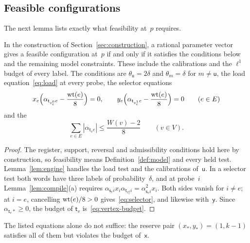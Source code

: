\subsection{Feasible configurations}\label{sec:feasible}

The next lemma lists exactly what feasibility at~$p$ requires.

\begin{lemma}\label{lem:feasible}
In the construction of Section~\ref{sec:construction}, a rational parameter
vector gives a feasible configuration at~$p$ if and only if it satisfies
the conditions below and the remaining model constraints. These include
the calibrations and the $\ell^1$ budget of every label. The conditions
are $\theta_{\mathsf u}=2\delta$ and $\theta_m=\delta$ for $m\neq\mathsf
u$, the load equation~\eqref{eq:load} at every probe, the selector
equations
\begin{equation}\label{eq:selector}
  x_e\Bigl(\alpha_{\mathsf t_{v_e^0}e}-\frac{\operatorname{wt}(e)}8\Bigr)=0,\qquad
  y_e\Bigl(\alpha_{\mathsf t_{v_e^1}e}-\frac{\operatorname{wt}(e)}8\Bigr)=0\qquad(e\in E)
\end{equation}
and the 
\begin{equation}\label{eq:vertex-budget}
  \sum_{e\in E}|\alpha_{\mathsf t_ve}|\le\frac{W(v)-2}8\qquad(v\in V).
\end{equation}
\end{lemma}

\begin{proof}
The register, support, reversal and admissibility conditions hold here by
construction, so feasibility means Definition~\ref{def:model} and every
held test. Lemma~\ref{lem:engine} handles the load test and the
calibrations of~$\mathsf u$. In a selector test both words have three
labels of probability~$\delta$, and at probe~$i$
Lemma~\ref{lem:compile}(a) requires
$\alpha_{\mathsf s_ei}x_i\alpha_{\mathsf t_{v_e^0}i}=\alpha_{\mathsf
s_ei}^2x_i$. Both sides vanish for $i\neq e$; at $i=e$, cancelling
$\operatorname{wt}(e)/8>0$ gives~\eqref{eq:selector}, and likewise with~$\mathsf y$.
Since $\alpha_{\mathsf t_v\ast}\ge0$, the budget of $\mathsf t_v$
is~\eqref{eq:vertex-budget}.
\end{proof}

The listed equations alone do not suffice: the reserve pair
$(x_\ast,y_\ast)=(1,k-1)$ satisfies all of them but violates the budget
of~$\mathsf x$.

